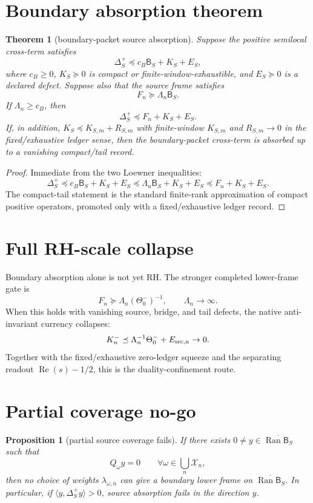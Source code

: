 \documentclass[11pt]{article}
\newtheorem{theorem}{Theorem}
\newtheorem{proposition}{Proposition}
\begin{document}
\section{Boundary absorption theorem}
\begin{theorem}[boundary-packet source absorption]
Suppose the positive semilocal cross-term satisfies
\[
  \Delta_S^+\preceq c_B\mathsf B_S+K_S+E_S,
\]
where \(c_B\ge0\), \(K_S\succeq0\) is compact or finite-window-exhaustible, and
\(E_S\succeq0\) is a declared defect.  Suppose also that the source frame satisfies
\[
  F_n\succeq \Lambda_n\mathsf B_S.
\]
If \(\Lambda_n\ge c_B\), then
\[
  \Delta_S^+\preceq F_n+K_S+E_S.
\]
If, in addition, \(K_S\preceq K_{S,m}+R_{S,m}\) with finite-window \(K_{S,m}\) and
\(R_{S,m}\to0\) in the fixed/exhaustive ledger sense, then the boundary-packet
cross-term is absorbed up to a vanishing compact/tail record.
\end{theorem}

\begin{proof}
Immediate from the two Loewner inequalities:
\[
 \Delta_S^+\preceq c_B\mathsf B_S+K_S+E_S
 \preceq \Lambda_n\mathsf B_S+K_S+E_S
 \preceq F_n+K_S+E_S.
\]
The compact-tail statement is the standard finite-rank approximation of compact
positive operators, promoted only with a fixed/exhaustive ledger record.
\end{proof}

\section{Full RH-scale collapse}
Boundary absorption alone is not yet RH.  The stronger completed lower-frame gate is
\[
  F_n\succeq \Lambda_n(\Theta_0^-)^{-1},
  \qquad \Lambda_n\to\infty.
\]
When this holds with vanishing source, bridge, and tail defects, the native anti-invariant
currency collapses:
\[
  K_n^-\preceq \Lambda_n^{-1}\Theta_0^-+E_{\rm src,n}\to0.
\]
Together with the fixed/exhaustive zero-ledger squeeze and the separating readout
\(\operatorname{Re}(s)-1/2\), this is the duality-confinement route.

\section{Partial coverage no-go}
\begin{proposition}[partial source coverage fails]
If there exists \(0\ne y\in\overline{\operatorname{Ran}\mathsf B_S}\) such that
\[
  Q_\omega y=0\qquad\forall\omega\in\bigcup_n\mathcal X_n,
\]
then no choice of weights \(\lambda_{\omega,n}\) can give a boundary lower frame on
\(\overline{\operatorname{Ran}\mathsf B_S}\).  In particular, if
\(\langle y,\Delta_S^+y\rangle>0\), source absorption fails in the direction \(y\).
\end{proposition}
\end{document}
